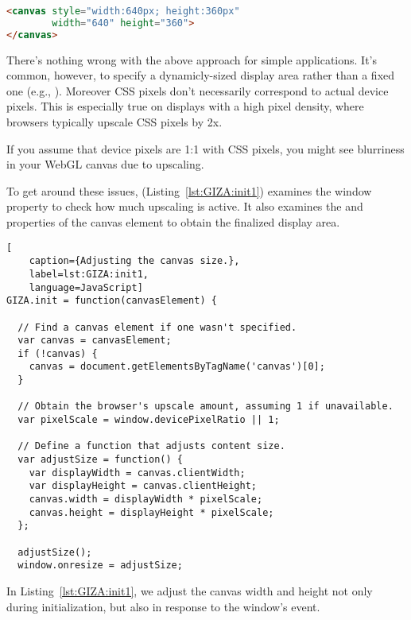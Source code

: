 \begin{lstlisting}[language=HTML]
<canvas style="width:640px; height:360px"
        width="640" height="360">
</canvas>
\end{lstlisting}

There's nothing wrong with the above approach for simple applications.  It's common, however, to specify a dynamicly-sized display area rather than a fixed one (e.g., ).  Moreover CSS pixels don't necessarily correspond to actual device pixels.  This is especially true on displays with a high pixel density, where browsers typically upscale CSS pixels by 2x.

\begin{sidenote}
If you assume that device pixels are 1:1 with CSS pixels, you might see blurriness in your WebGL canvas due to upscaling.
\end{sidenote}

To get around these issues,  (Listing~\ref{lst:GIZA:init1}) examines the  window property to check how much upscaling is active.  It also examines the   and  properties of the canvas element to obtain the finalized display area.

\begin{lstlisting}[
    caption={Adjusting the canvas size.},
    label=lst:GIZA:init1,
    language=JavaScript]
GIZA.init = function(canvasElement) {

  // Find a canvas element if one wasn't specified.
  var canvas = canvasElement;
  if (!canvas) {
    canvas = document.getElementsByTagName('canvas')[0];
  }

  // Obtain the browser's upscale amount, assuming 1 if unavailable.
  var pixelScale = window.devicePixelRatio || 1;

  // Define a function that adjusts content size.
  var adjustSize = function() {
    var displayWidth = canvas.clientWidth;
    var displayHeight = canvas.clientHeight;
    canvas.width = displayWidth * pixelScale;
    canvas.height = displayHeight * pixelScale;
  };

  adjustSize();
  window.onresize = adjustSize;
\end{lstlisting} 

In Listing~\ref{lst:GIZA:init1}, we adjust the canvas width and height not only during initialization, but also in response to the window's   event.

